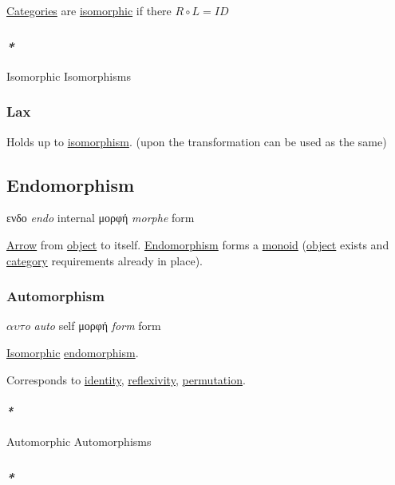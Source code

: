 \documentclass[a4paper,14pt,oneside]{book}
\begin{document}
\hyperref[org4d3db22]{Categories} are \hyperref[org20ec5f8]{isomorphic} if there \(R \circ L = ID\)

\subsubsection{\emph{*}}
\label{sec:orgbbb771b}

\label{org20ec5f8}Isomorphic
\label{org128ae3a}Isomorphisms

\subsubsection{\label{org570480f}Lax}
\label{sec:orgd50be7b}
Holds up to \hyperref[orgbdccea4]{isomorphism}.
(upon the transformation can be used as the same)

\subsection{\label{orgc18c953}Endomorphism}
\label{sec:org225acc4}
ενδο \emph{endo} internal
μορφή \emph{morphe} form

\hyperref[org74f3926]{Arrow} from \hyperref[orged022cb]{object} to itself.
\hyperref[orgc18c953]{Endomorphism} forms a \hyperref[orgb10cc2a]{monoid} (\hyperref[orged022cb]{object} exists and \hyperref[orge2e250a]{category} requirements already in place).

\subsubsection{\label{org8a49b06}Automorphism}
\label{sec:org93ea5a6}
\(\alpha \upsilon \tau\)\textit{o} \emph{auto} self
μορφή \emph{form} form

\hyperref[org20ec5f8]{Isomorphic} \hyperref[orgc18c953]{endomorphism}.

Corresponds to \hyperref[orgc014b57]{identity}, \hyperref[org18bd877]{reflexivity}, \hyperref[orgfd00159]{permutation}.

\paragraph{\emph{*}}
\label{sec:orga56cbe2}

\label{org00d7155}Automorphic
\label{orga95fc05}Automorphisms

\subsubsection{\emph{*}}
\label{sec:orge65f87c}
\end{document}
